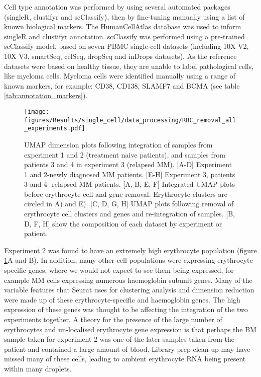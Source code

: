 Cell type annotation was performed by using several automated packages (singleR, clustifyr and scClassify), then by fine-tuning manually using a list of known biological markers.
The HumanCellAtlas database was used to inform singleR and clustifyr annotation.
scClassify was performed using a pre-trained scClassify model, based on seven PBMC single-cell datasets (including 10X V2, 10X V3, smartSeq, celSeq, dropSeq and inDrops datasets).
As the reference datasets were based on healthy tissue, they are unable to label pathological cells, like myeloma cells.
Myeloma cells were identified manually using a range of known markers, for example: CD38, CD138, SLAMF7 and BCMA (see table \ref{tab:annotation_markers}).

\begin{figure}[htb]
    \centering
    \texttt{[image: figures/Results/single\_cell/data\_processing/RBC\_removal\_all\_experiments.pdf]}
    \caption[Erythrocyte removal from integrated scRNA-seq datasets]{UMAP dimension plots following integration of samples from experiment 1 and 2 (treatment naive patients), and samples from patients 3 and 4 in experiment 3 (relapsed MM).
    [A-D] Experiment 1 and 2-newly diagnosed MM patients.
    [E-H] Experiment 3, patients 3 and 4- relapsed MM patients.
     [A, B, E, F] Integrated UMAP plots before erythrocyte cell and gene removal. Erythrocyte clusters are circled in A) and E).
     [C, D, G, H] UMAP plots following removal of erythrocyte cell clusters and genes and re-integration of samples.
     [B, D, F, H] show the composition of each dataset by experiment or patient.}
    \label{fig:umap_RBC}
\end{figure}

Experiment 2 was found to have an extremely high erythrocyte population (figure \ref{fig:umap_RBC}A and B).
In addition, many other cell populations were expressing erythrocyte specific genes, where we would not expect to see them being expressed, for example MM cells expressing numerous haemoglobin subunit genes.
Many of the variable features that Seurat uses for clustering analysis and dimension reduction were made up of these erythrocyte-specific and haemoglobin genes.
The high expression of these genes was thought to be affecting the integration of the two experiments together.
A theory for the presence of the large number of erythrocytes and un-localised erythrocyte gene expression is that perhaps the BM sample taken for experiment 2 was one of the later samples taken from the patient and contained a large amount of blood.
Library prep clean-up may have missed many of these cells, leading to ambient erythrocyte RNA being present within many droplets.

